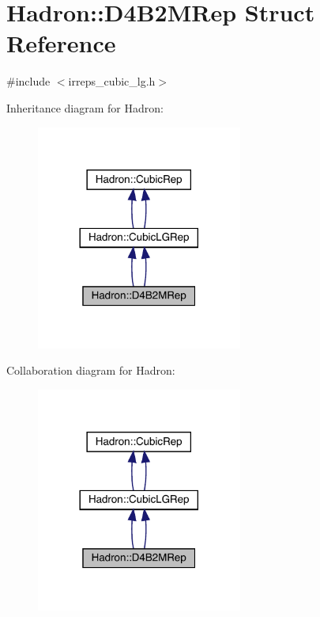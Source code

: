 \hypertarget{structHadron_1_1D4B2MRep}{}\section{Hadron\+:\+:D4\+B2\+M\+Rep Struct Reference}
\label{structHadron_1_1D4B2MRep}


{\ttfamily \#include $<$irreps\+\_\+cubic\+\_\+lg.\+h$>$}



Inheritance diagram for Hadron\+:\nopagebreak
\begin{figure}[H]
\begin{center}
\leavevmode
\includegraphics[width=192pt]{d4/d33/structHadron_1_1D4B2MRep__inherit__graph}
\end{center}
\end{figure}


Collaboration diagram for Hadron\+:\nopagebreak
\begin{figure}[H]
\begin{center}
\leavevmode
\includegraphics[width=192pt]{dc/d76/structHadron_1_1D4B2MRep__coll__graph}
\end{center}
\end{figure}

